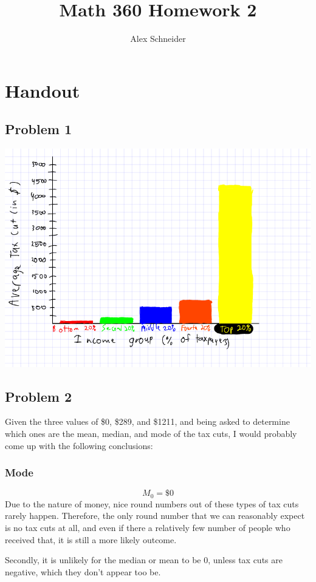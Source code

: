 \documentclass[11pt]{article}
\title{Math 360 Homework 2}
\author{Alex Schneider}
\begin{document}
\maketitle
\section*{Handout}
\subsection*{Problem 1}
\includegraphics{homework2_handout_problem1_bargraph}

\subsection*{Problem 2}
Given the three values of \$0, \$289, and \$1211, and being asked to determine which
ones are the mean, median, and mode of the tax cuts, I would probably come up
with the following conclusions:

\subsubsection*{Mode}
\[M_0 = \$0\]
Due to the nature of money, nice round numbers out of these types of tax cuts
rarely happen. Therefore, the only round number that we can reasonably expect
is no tax cuts at all, and even if there a relatively few number of people who
received that, it is still a more likely outcome. 

Secondly, it is unlikely for the median or mean to be 0, unless tax cuts are
negative, which they don't appear too be. 
\end{document}
